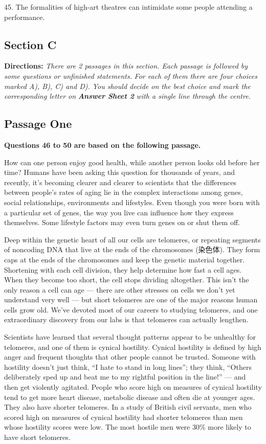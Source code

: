 \documentclass[UTF8,11pt]{ctexart}
\begin{document}
45. The formalities of high-art theatres can intimidate some people attending a performance.


\subsection*{\textbf{Section C}}


\textbf{Directions: }\textit{There are 2 passages in this section. Each passage is followed by some questions or unfinished statements.} \textit{For each of them there are four choices marked A), B), C) and D). You should decide on the best choice and mark the} \textit{corresponding letter on }\textbf{\textit{Answer Sheet 2}}\textit{ with a single line through the centre.}


\subsection*{\textbf{Passage One}}


\textbf{Questions 46 to 50 are based on the following passage.}


How can one person enjoy good health, while another person looks old before her time? Humans have been asking this question for thousands of years, and recently, it’s becoming clearer and clearer to scientists that the differences between people’s rates of aging lie in the complex interactions among genes, social relationships, environments and lifestyles. Even though you were born with a particular set of genes, the way you live can influence how they express themselves. Some lifestyle factors may even turn genes on or shut them off.


Deep within the genetic heart of all our cells are telomeres, or repeating segments of noncoding DNA that live at the ends of the chromosomes (染色体). They form caps at the ends of the chromosomes and keep the genetic material together. Shortening with each cell division, they help determine how fast a cell ages. When they become too short, the cell stops dividing altogether. This isn’t the only reason a cell can age — there are other stresses on cells we don’t yet understand very well — but short telomeres are one of the major reasons human cells grow old. We’ve devoted most of our careers to studying telomeres, and one extraordinary discovery from our labs is that telomeres can actually lengthen.


Scientists have learned that several thought patterns appear to be unhealthy for telomeres, and one of them is cynical hostility. Cynical hostility is defined by high anger and frequent thoughts that other people cannot be trusted. Someone with hostility doesn’t just think, “I hate to stand in long lines”; they think, “Others deliberately sped up and beat me to my rightful position in the line!” — and then get violently agitated. People who score high on measures of cynical hostility tend to get more heart disease, metabolic disease and often die at younger ages. They also have shorter telomeres. In a study of British civil servants, men who scored high on measures of cynical hostility had shorter telomeres than men whose hostility scores were low. The most hostile men were 30\% more likely to have short telomeres.
\end{document}
